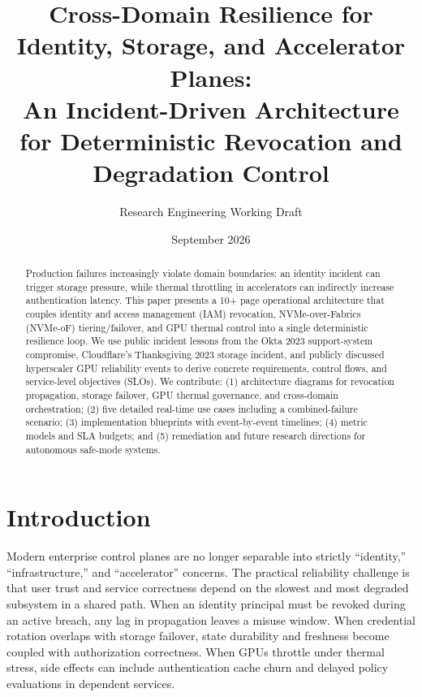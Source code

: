 \documentclass[12pt]{article}
\title{Cross-Domain Resilience for Identity, Storage, and Accelerator Planes:\\An Incident-Driven Architecture for Deterministic Revocation and Degradation Control}
\author{Research Engineering Working Draft}
\date{September 2026}
\begin{document}
\maketitle

\begin{abstract}
Production failures increasingly violate domain boundaries: an identity incident can trigger storage pressure, while thermal throttling in accelerators can indirectly increase authentication latency. This paper presents a 10+ page operational architecture that couples identity and access management (IAM) revocation, NVMe-over-Fabrics (NVMe-oF) tiering/failover, and GPU thermal control into a single deterministic resilience loop. We use public incident lessons from the Okta 2023 support-system compromise, Cloudflare's Thanksgiving 2023 storage incident, and publicly discussed hyperscaler GPU reliability events to derive concrete requirements, control flows, and service-level objectives (SLOs). We contribute: (1) architecture diagrams for revocation propagation, storage failover, GPU thermal governance, and cross-domain orchestration; (2) five detailed real-time use cases including a combined-failure scenario; (3) implementation blueprints with event-by-event timelines; (4) metric models and SLA budgets; and (5) remediation and future research directions for autonomous safe-mode systems.
\end{abstract}

\section{Introduction}
Modern enterprise control planes are no longer separable into strictly ``identity,'' ``infrastructure,'' and ``accelerator'' concerns. The practical reliability challenge is that user trust and service correctness depend on the slowest and most degraded subsystem in a shared path. When an identity principal must be revoked during an active breach, any lag in propagation leaves a misuse window. When credential rotation overlaps with storage failover, state durability and freshness become coupled with authorization correctness. When GPUs throttle under thermal stress, side effects can include authentication cache churn and delayed policy evaluations in dependent services.
\end{document}
